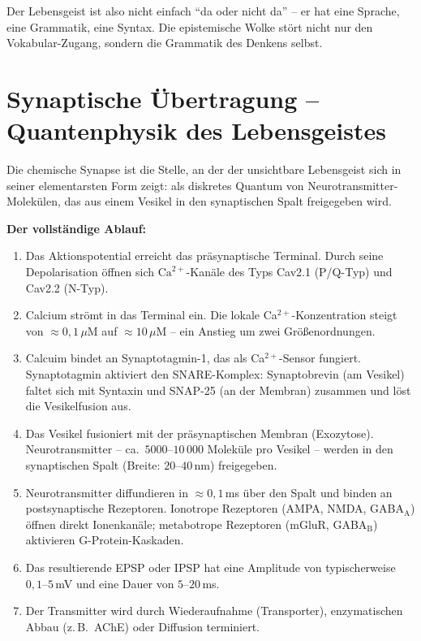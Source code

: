 ﻿\documentclass[12pt,a4paper]{report}
\theoremstyle{plain}
\theoremstyle{definition}
\theoremstyle{remark}
\begin{document}
	Der Lebensgeist ist also nicht einfach ``da oder nicht da'' -- er hat eine
	Sprache, eine Grammatik, eine Syntax. Die epistemische Wolke stört
	nicht nur den Vokabular-Zugang, sondern die Grammatik des Denkens selbst.
	
	\section{Synaptische Übertragung -- Quantenphysik des Lebensgeistes}
	
	Die chemische Synapse ist die Stelle, an der der unsichtbare Lebensgeist
	sich in seiner elementarsten Form zeigt: als diskretes Quantum von
	Neurotransmitter-Molekülen, das aus einem Vesikel in den synaptischen
	Spalt freigegeben wird.
	
	\textbf{Der vollständige Ablauf:}
	\begin{enumerate}[label=\arabic*., leftmargin=1.8cm]
		\item Das Aktionspotential erreicht das präsynaptische Terminal.
		Durch seine Depolarisation öffnen sich $\mathrm{Ca}^{2+}$-Kanäle
		des Typs Cav2.1 (P/Q-Typ) und Cav2.2 (N-Typ).
		\item Calcium strömt in das Terminal ein.
		Die lokale Ca$^{2+}$-Konzentration steigt von $\approx 0{,}1\,\mu$M
		auf $\approx 10\,\mu$M -- ein Anstieg um zwei Grö\ss{}enordnungen.
		\item Calcuim bindet an Synaptotagmin-1, das als Ca$^{2+}$-Sensor fungiert.
		Synaptotagmin aktiviert den SNARE-Komplex: Synaptobrevin (am Vesikel)
		faltet sich mit Syntaxin und SNAP-25 (an der Membran) zusammen
		und löst die Vesikelfusion aus.
		\item Das Vesikel fusioniert mit der präsynaptischen Membran
		(Exozytose). Neurotransmitter -- ca.\ $5000$--$10\,000$ Moleküle
		pro Vesikel -- werden in den synaptischen Spalt (Breite: $20$--$40$\,nm)
		freigegeben.
		\item Neurotransmitter diffundieren in $\approx 0{,}1$\,ms über den Spalt
		und binden an postsynaptische Rezeptoren.
		Ionotrope Rezeptoren (AMPA, NMDA, GABA$_\mathrm{A}$) öffnen
		direkt Ionenkanäle; metabotrope Rezeptoren (mGluR, GABA$_\mathrm{B}$)
		aktivieren G-Protein-Kaskaden.
		\item Das resultierende EPSP oder IPSP hat eine Amplitude von
		typischerweise $0{,}1$--$5$\,mV und eine Dauer von $5$--$20$\,ms.
		\item Der Transmitter wird durch Wiederaufnahme (Transporter),
		enzymatischen Abbau (z.\,B.\ AChE) oder Diffusion terminiert.
	\end{enumerate}
	
\end{document}
